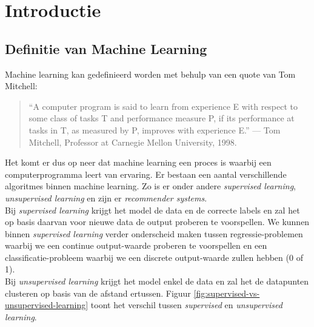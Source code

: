 \section{Introductie}

\subsection{Definitie van Machine Learning}

Machine learning kan gedefinieerd worden met behulp van een quote van Tom Mitchell: 

\begin{quote}
	“A computer program is said to learn from experience E with respect to some class of tasks T and performance measure P, if its performance at tasks in T, as measured by P, improves with experience E.” — Tom Mitchell, Professor at Carnegie Mellon University, 1998. 
\end{quote}

\noindent
Het komt er dus op neer dat machine learning een proces  is waarbij een computerprogramma leert van ervaring. Er bestaan een aantal verschillende algoritmes binnen machine learning. Zo is er onder andere \textit{supervised learning}, \textit{unsupervised learning} en zijn er \textit{recommender systems}. \\
\newline
Bij \textit{supervised learning} krijgt het model de data en de correcte labels en zal het op basis daarvan voor nieuwe data de output proberen te voorspellen. We kunnen binnen \textit{supervised learning} verder onderscheid maken tussen regressie-problemen waarbij we een continue output-waarde proberen te voorspellen en een classificatie-probleem waarbij we een discrete output-waarde zullen hebben (0 of 1). \\
\newline
Bij \textit{unsupervised learning} krijgt het model enkel de data en zal het de datapunten clusteren op basis van de afstand ertussen. Figuur \ref{fig:supervised-vs-unsupervised-learning} toont het verschil tussen \textit{supervised} en \textit{unsupervised learning}.

